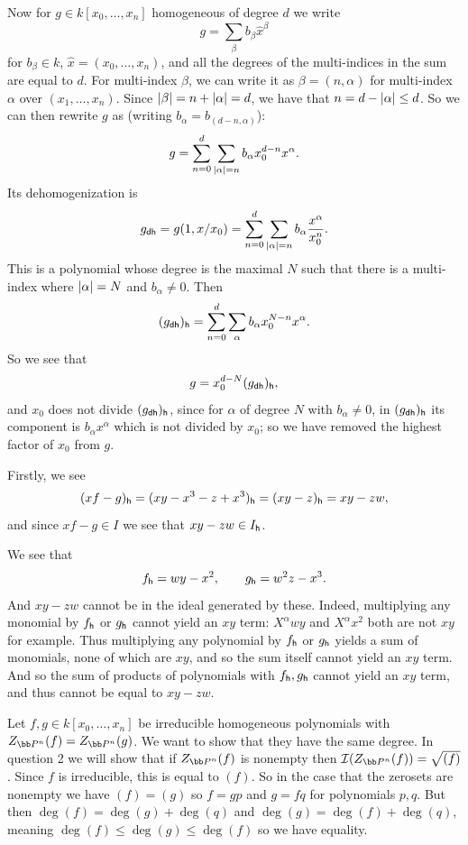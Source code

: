     Now for $g\in k[x_0,\dots,x_n]$ homogeneous of degree $d$ we write
    $$ g = \sum_\beta b_\beta\hat x^\beta $$
    for $b_\beta\in k$, $\hat x=(x_0,\dots,x_n)$, and all the degrees of the multi-indices in the sum are equal to $d$.
    For multi-index $\beta$, we can write it as $\beta=(n,\alpha)$ for multi-index $\alpha$ over $(x_1,\dots,x_n)$.
    Since $\mathopen{}\mathclose{\left|\beta\right|}=n+\mathopen{}\mathclose{\left|\alpha\right|}=d$, we have that $n=d-\mathopen{}\mathclose{\left|\alpha\right|}\leq d$.
    So we can then rewrite $g$ as (writing $b_\alpha=b_{(d-n,\alpha)}$):
    $$ g = \sum_{n=0}^d\sum_{\mathopen{}\mathclose{\left|\alpha\right|}=n} b_{\alpha}x_0^{d-n}x^\alpha . $$
    Its dehomogenization is
    $$ g_{\sf dh} = g(1,x/x_0) = \sum_{n=0}^d\sum_{\mathopen{}\mathclose{\left|\alpha\right|}=n} b_\alpha{{x^\alpha}\over{x_0^n}} . $$
    This is a polynomial whose degree is the maximal $N$ such that there is a multi-index where $\mathopen{}\mathclose{\left|\alpha\right|}=N$ and $b_{\alpha}\neq0$.
    Then
    $$ (g_{\sf dh})_{\sf h} = \sum_{n=0}^d\sum_\alpha b_{\alpha}x_0^{N-n}x^\alpha . $$
    So we see that
    $$ g = x_0^{d-N}(g_{\sf dh})_{\sf h} , $$
    and $x_0$ does not divide $(g_{\sf dh})_{\sf h}$, since for $\alpha$ of degree $N$ with $b_\alpha\neq0$, in $(g_{\sf dh})_{\sf h}$ its component is
    $b_\alpha x^\alpha$ which is not divided by $x_0$; so we have removed the highest factor of $x_0$ from $g$.

    \item Firstly, we see
    $$ (xf-g)_{\sf h} = (xy-x^3 - z + x^3)_{\sf h} = (xy - z)_{\sf h} = xy - zw , $$
    and since $xf-g\in I$ we see that $xy-zw\in I_{\sf h}$.

    We see that
    $$ f_{\sf h} = wy - x^2,\qquad g_{\sf h} = w^2z - x^3 . $$
    And $xy-zw$ cannot be in the ideal generated by these.
    Indeed, multiplying any monomial by $f_{\sf h}$ or $g_{\sf h}$ cannot yield an $xy$ term: $X^\alpha wy$ and $X^\alpha x^2$ both are not $xy$ for example.
    Thus multiplying any polynomial by $f_{\sf h}$ or $g_{\sf h}$ yields a sum of monomials, none of which are $xy$, and so the sum itself cannot yield an $xy$ term.
    And so the sum of products of polynomials with $f_{\sf h},g_{\sf h}$ cannot yield an $xy$ term, and thus cannot be equal to $xy-zw$.

    \item Let $f,g\in k[x_0,\dots,x_n]$ be irreducible homogeneous polynomials with $Z_{\bP^n}(f)=Z_{\bP^n}(g)$.
    We want to show that they have the same degree.
    In question 2 we will show that if $Z_{\bP^n}(f)$ is nonempty then $\I(Z_{\bP^n}(f))=\sqrt{(f)}$.
    Since $f$ is irreducible, this is equal to $(f)$.
    So in the case that the zerosets are nonempty we have $(f)=(g)$ so $f=gp$ and $g=fq$ for polynomials $p,q$.
    But then $\deg(f)=\deg(g)+\deg(q)$ and $\deg(g)=\deg(f)+\deg(q)$, meaning $\deg(f)\leq\deg(g)\leq\deg(f)$ so we have equality.
\eenum

